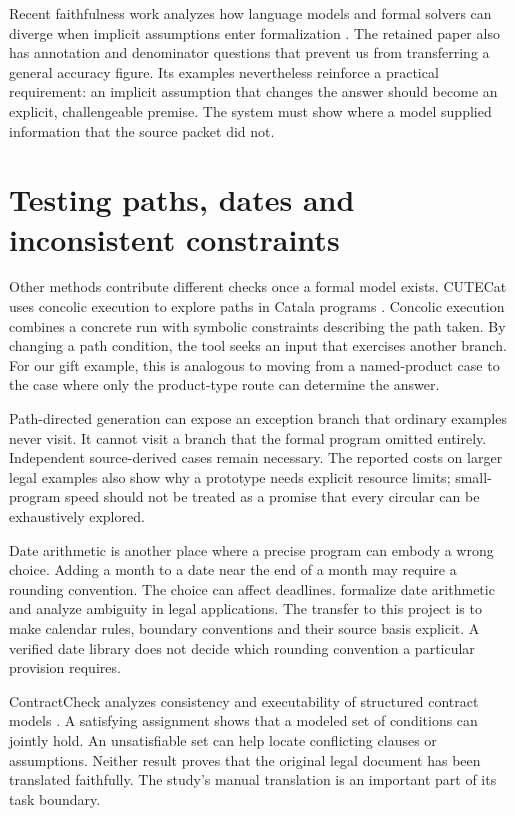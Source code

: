 Recent faithfulness work analyzes how language models and formal solvers can
diverge when implicit assumptions enter formalization \citep{limits2026}.
The retained paper also has annotation and denominator questions that prevent
us from transferring a general accuracy figure. Its examples nevertheless
reinforce a practical requirement: an implicit assumption that changes the
answer should become an explicit, challengeable premise. The system must
show where a model supplied information that the source packet did not.

\section{Testing paths, dates and inconsistent constraints}
\label{merge:M04:13}

\label{sec:languages-analysis}
Other methods contribute different checks once a formal model exists.
CUTECat uses concolic execution to explore paths in Catala programs
\citep[secs.~2--5]{cutecat2025}. Concolic execution combines a concrete run
with symbolic constraints describing the path taken. By changing a path
condition, the tool seeks an input that exercises another branch. For our
gift example, this is analogous to moving from a named-product case to the
case where only the product-type route can determine the answer.

Path-directed generation can expose an exception branch that ordinary
examples never visit. It cannot visit a branch that the formal program
omitted entirely. Independent source-derived cases remain necessary. The
reported costs on larger legal examples also show why a prototype needs
explicit resource limits; small-program speed should not be treated as a
promise that every circular can be exhaustively explored.

Date arithmetic is another place where a precise program can embody a wrong
choice. Adding a month to a date near the end of a month may require a
rounding convention. The choice can affect deadlines. \citet{dates2024}
formalize date arithmetic and analyze ambiguity in legal applications. The
transfer to this project is to make calendar rules, boundary conventions and
their source basis explicit. A verified date library does not decide which
rounding convention a particular provision requires.


ContractCheck analyzes consistency and executability of structured contract
models \citep[secs.~3--8]{contractcheck2025}. A satisfying assignment shows
that a modeled set of conditions can jointly hold. An unsatisfiable set can
help locate conflicting clauses or assumptions. Neither result proves that
the original legal document has been translated faithfully. The study's
manual translation is an important part of its task boundary.

